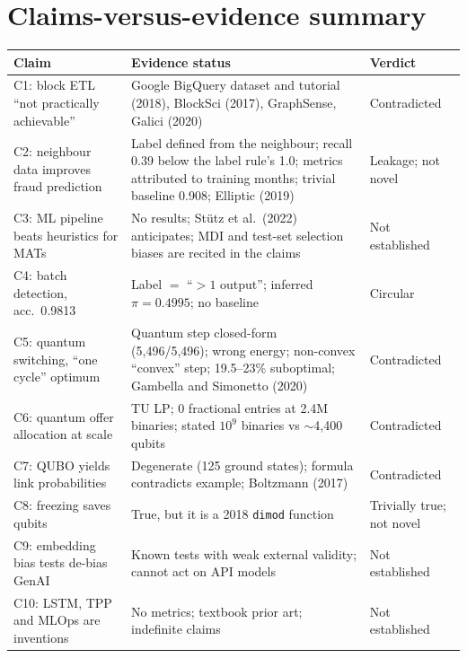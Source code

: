 \documentclass[10pt,a4paper]{article}
\begin{document}
\section{Claims-versus-evidence summary}
\renewcommand{\arraystretch}{1.15}
\begin{tabularx}{\textwidth}{>{\raggedright\arraybackslash}p{4.4cm}>{\raggedright\arraybackslash}X>{\raggedright\arraybackslash}p{2.3cm}}
\toprule
Claim & Evidence status & Verdict \\
\midrule
C1: block ETL ``not practically achievable'' & Google BigQuery dataset and tutorial (2018), BlockSci (2017), GraphSense, Galici (2020) & Contradicted \\
C2: neighbour data improves fraud prediction & Label defined from the neighbour; recall 0.39 below the label rule's 1.0; metrics attributed to training months; trivial baseline 0.908; Elliptic (2019) & Leakage; not novel \\
C3: ML pipeline beats heuristics for MATs & No results; St\"utz et al.\ (2022) anticipates; MDI and test-set selection biases are recited in the claims & Not established \\
C4: batch detection, acc.\ 0.9813 & Label $=$ ``$>1$ output''; inferred $\pi=0.4995$; no baseline & Circular \\
C5: quantum switching, ``one cycle'' optimum & Quantum step closed-form (5,496/5,496); wrong energy; non-convex ``convex'' step; 19.5--23\% suboptimal; Gambella and Simonetto (2020) & Contradicted \\
C6: quantum offer allocation at scale & TU LP; 0 fractional entries at 2.4M binaries; stated $10^9$ binaries vs $\sim$4,400 qubits & Contradicted \\
C7: QUBO yields link probabilities & Degenerate (125 ground states); formula contradicts example; Boltzmann (2017) & Contradicted \\
C8: freezing saves qubits & True, but it is a 2018 \texttt{dimod} function & Trivially true; not novel \\
C9: embedding bias tests de-bias GenAI & Known tests with weak external validity; cannot act on API models & Not established \\
C10: LSTM, TPP and MLOps are inventions & No metrics; textbook prior art; indefinite claims & Not established \\
\bottomrule
\end{tabularx}

\end{document}
